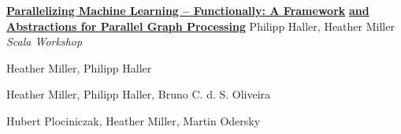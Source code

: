 \documentclass[9pt]{article}
\begin{document}
\noindent\href{http://infoscience.epfl.ch/record/165111}{\bf Parallelizing Machine Learning -- Functionally: A Framework}\vspace{-0.03in}
\newline\noindent\href{http://infoscience.epfl.ch/record/165111}{\bf and Abstractions for Parallel Graph Processing}
\newline\noindent Philipp Haller, Heather Miller
\newline\noindent\emph{Scala Workshop}
\bigskip




\dates{}
\newline\noindent Heather Miller, Philipp Haller
\bigskip

\dates{}
\newline\noindent Heather Miller, Philipp Haller, Bruno C. d. S. Oliveira
\bigskip

\dates{}
\newline\noindent Hubert Plociniczak, Heather Miller, Martin Odersky
\bigskip


\end{document}
